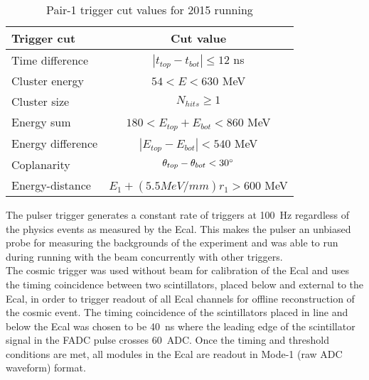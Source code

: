 \begin{table}[H]
\caption{Pair-1 trigger cut values for 2015 running}
\label{tab:pairTriggerVals}
\centering
\begin{tabular}{lc}
\toprule
Trigger cut & Cut value \\
\midrule
Time difference & $| t_{top}-t_{bot} | \leq12$ ns   \\
Cluster energy & $54<E<630$ MeV \\
Cluster size & $N_{hits}\geq 1$\\
Energy sum & $180<E_{top}+E_{bot}<860$ MeV\\
Energy difference & $| E_{top}-E_{bot}|<540$ MeV\\
Coplanarity & $\theta_{top}-\theta_{bot}<30\degree $\\
Energy-distance & $E_{1}+(5.5 MeV/mm)r_{1}>600$ MeV\\ 
\bottomrule
\end{tabular}
\end{table}

\indent The pulser trigger generates a constant rate of triggers at 100~Hz regardless of the physics events as measured by the Ecal. This makes the pulser an unbiased probe for measuring the backgrounds of the experiment and was able to run during running with the beam concurrently with other triggers.\\ 
\indent The cosmic trigger was used without beam for calibration of the Ecal and uses the timing coincidence between two scintillators, placed below and external to the Ecal, in order to trigger readout of all Ecal channels for offline reconstruction of the cosmic event. The timing coincidence of the scintillators placed in line and below the Ecal was chosen to be 40~ns where the leading edge of the scintillator signal in the FADC pulse crosses 60~ADC. Once the timing and threshold conditions are met, all modules in the Ecal are readout in Mode-1 (raw ADC waveform) format. 
